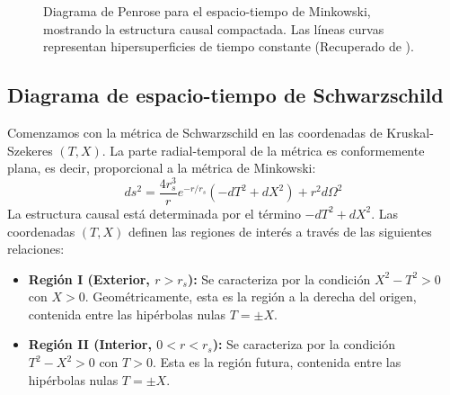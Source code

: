 \begin{figure}[H]
  \caption{Diagrama de Penrose para el espacio-tiempo de Minkowski, mostrando la estructura causal compactada. Las líneas curvas representan hipersuperficies de tiempo constante (Recuperado de \cite{neutelings-2024}).}
\end{figure}
\subsection{Diagrama de espacio-tiempo de Schwarzschild}

Comenzamos con la métrica de Schwarzschild en las coordenadas de Kruskal-Szekeres $(T, X)$. La parte radial-temporal de la métrica es conformemente plana, es decir, proporcional a la métrica de Minkowski:
\begin{equation}
  ds^2 = \frac{4r_s^3}{r} e^{-r/r_s}(-dT^2 + dX^2) + r^2 d\Omega^2
\end{equation}
La estructura causal está determinada por el término $-dT^2 + dX^2$. Las coordenadas $(T, X)$ definen las regiones de interés a través de las siguientes relaciones:

\begin{itemize}
  \item \textbf{Región I (Exterior, $r > r_s$):} Se caracteriza por la condición $X^2 - T^2 > 0$ con $X > 0$. Geométricamente, esta es la región a la derecha del origen, contenida entre las hipérbolas nulas $T = \pm X$.

  \item \textbf{Región II (Interior, $0 < r < r_s$):} Se caracteriza por la condición $T^2 - X^2 > 0$ con $T > 0$. Esta es la región futura, contenida entre las hipérbolas nulas $T = \pm X$.
\end{itemize}

